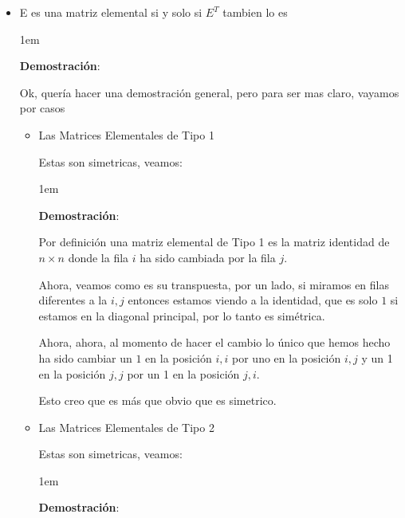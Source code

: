 \documentclass[12pt, fleqn]{report}                             %
\newenvironment{SmallIndentation}[1][0.75em]                    %
        {\begin{adjustwidth}{#1}{}\begin{footnotesize}}             %
        {\end{footnotesize}\end{adjustwidth}}                       %
\theoremstyle{break}                                            %
\begin{document}
\begin{itemize}
                \item
                    E es una matriz elemental si y solo si $E^T$ tambien lo es

                    \begin{SmallIndentation}[1em]
                        \textbf{Demostración}:
                        
                        Ok, quería hacer una demostración general, pero para ser mas claro, vayamos por casos
                        \begin{itemize}
                            \item Las Matrices Elementales de Tipo 1

                                Estas son simetricas, veamos:
                                \begin{SmallIndentation}[1em]
                                    \textbf{Demostración}:
                                    
                                    Por definición una matriz elemental de Tipo 1 es la matriz identidad de $n \times n$
                                    donde la fila $i$ ha sido cambiada por la fila $j$.

                                    Ahora, veamos como es su transpuesta, por un lado, si miramos en filas diferentes a la $i, j$
                                    entonces estamos viendo a la identidad, que es solo $1$ si estamos en la diagonal principal, por
                                    lo tanto es simétrica.

                                    Ahora, ahora, al momento de hacer el cambio lo único que hemos hecho ha sido cambiar un $1$ en la
                                    posición $i, i$ por uno en la posición $i, j$ y un 1 en la posición $j, j$ por un 1 en la posición $j, i$.

                                    Esto creo que es más que obvio que es simetrico.

                                \end{SmallIndentation}

                            \item Las Matrices Elementales de Tipo 2

                                Estas son simetricas, veamos:
                                \begin{SmallIndentation}[1em]
                                    \textbf{Demostración}:
                                    

\end{SmallIndentation}
\end{itemize}
\end{SmallIndentation}
\end{itemize}
\end{document}
